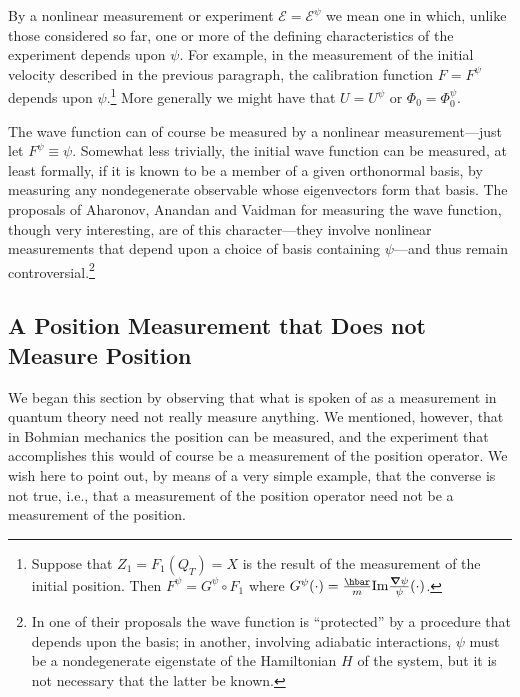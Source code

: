 \documentclass[12pt]{article}
\newcommand{\E}{\mbox{$\mathscr{E}$}}
\begin{document}
By a nonlinear measurement or experiment $\E=\E^\psi$ we mean one in
which, unlike those considered so far, one or more of the defining
characteristics of the experiment depends upon $\psi$. For example, in
the measurement of the initial velocity described in the previous
paragraph, the calibration function $F=F^\psi$ depends upon
$\psi$.\footnote{Suppose that ${Z}_1=F_1(Q_T)=X$ is the result of the
   measurement of the initial position. Then $F^\psi=G^\psi\circ F_1$
   where $G^\psi(\cdot)= \frac{\hbar}{m}{\rm
     Im}\frac{\boldsymbol{\nabla}\psi}{\psi}(\cdot)$.}  More generally
we might have that $U=U^\psi$ or $\Phi_0=\Phi_0^\psi$.

The wave function can of course be measured by a nonlinear
measurement---just let $F^\psi\equiv\psi$. Somewhat less trivially,
the initial wave function can be measured, at least formally, if it is
known to be a member of a given orthonormal basis, by measuring any
nondegenerate observable whose eigenvectors form that basis. The
proposals of Aharonov, Anandan and Vaidman \cite{AAV93} for measuring
the wave function, though very interesting, are of this
character---they involve nonlinear measurements that depend upon a
choice of basis containing $\psi$---and thus remain
controversial.\footnote{In one of their proposals the wave function is
   ``protected'' by a procedure that depends upon the basis; in
   another, involving adiabatic interactions, $\psi$ must be a
   nondegenerate eigenstate of the Hamiltonian $H$ of the system, but
   it is not necessary that the latter be known.}

\subsection{A Position Measurement that Does not Measure  Position}
\label{secapm}
We began this section by observing that what is spoken of as a
measurement in quantum theory need not really measure anything. We
mentioned, however, that in Bohmian mechanics the position can be
measured, and the experiment that accomplishes this would of course be
a measurement of the position operator. We wish here to point out, by
means of a very simple example, that the converse is not true, i.e.,
that a measurement of the position operator need not be a measurement
of the position.
\end{document}
